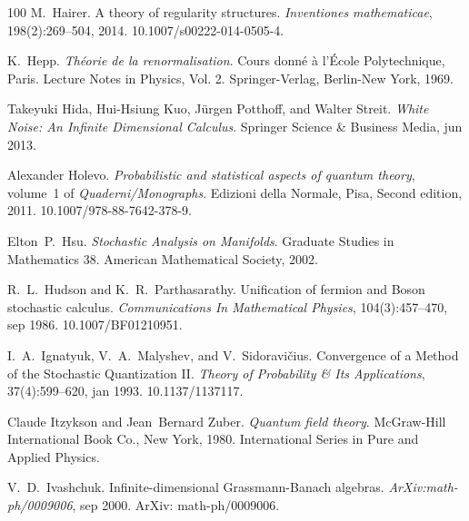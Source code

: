 \documentclass{article}
\newcommand{\tmtextit}[1]{{\itshape{#1}}}
\begin{document}
\begin{thebibliography}{100}
  M.~Hairer. {\newblock}A theory of regularity
  structures. {\newblock}\tmtextit{Inventiones mathematicae}, 198(2):269--504,
  2014.
  {\newblock}\href{Https://doi.org/10.1007/s00222-014-0505-4}{}10.1007/s00222-014-0505-4.{\newblock}
  
  K.~Hepp. {\newblock}\tmtextit{Th{\'e}orie de la
  renormalisation}. {\newblock}Cours donn{\'e} {\`a} l'{\'E}cole
  Polytechnique, Paris. Lecture Notes in Physics, Vol. 2. Springer-Verlag,
  Berlin-New York, 1969.{\newblock}
  
  Takeyuki Hida, Hui-Hsiung Kuo, J{\"u}rgen
  Potthoff, and  Walter Streit. {\newblock}\tmtextit{White Noise: An Infinite
  Dimensional Calculus}. {\newblock}Springer Science \& Business Media, jun
  2013.{\newblock}
  
  Alexander Holevo. {\newblock}\tmtextit{Probabilistic and
  statistical aspects of quantum theory},  volume~1  of
  \tmtextit{Quaderni/Monographs}. {\newblock}Edizioni della Normale, Pisa,
  Second  edition, 2011.
  {\newblock}\href{Https://doi.org/10.1007/978-88-7642-378-9}{}10.1007/978-88-7642-378-9.{\newblock}
  
  Elton~P.~Hsu.
  {\newblock}\tmtextit{Stochastic Analysis on Manifolds}. {\newblock}Graduate
  Studies in Mathematics 38. American Mathematical Society, 2002.{\newblock}
  
  R.~L.~Hudson  and  K.~R.~Parthasarathy.
  {\newblock}Unification of fermion and Boson stochastic calculus.
  {\newblock}\tmtextit{Communications In Mathematical Physics},
  104(3):457--470, sep 1986.
  {\newblock}\href{Https://doi.org/10.1007/BF01210951}{}10.1007/BF01210951.{\newblock}
  
  I.~A.~Ignatyuk, V.~A.~Malyshev, and 
  V.~Sidoravi{\v c}ius. {\newblock}Convergence of a Method of the Stochastic
  Quantization II. {\newblock}\tmtextit{Theory of Probability \& Its
  Applications}, 37(4):599--620, jan 1993.
  {\newblock}\href{Https://doi.org/10.1137/1137117}{}10.1137/1137117.{\newblock}
  
  Claude Itzykson  and  Jean~Bernard Zuber.
  {\newblock}\tmtextit{Quantum field theory}. {\newblock}McGraw-Hill
  International Book Co., New York, 1980. {\newblock}International Series in
  Pure and Applied Physics.{\newblock}
  
  V.~D.~Ivashchuk.
  {\newblock}Infinite-dimensional Grassmann-Banach algebras.
  {\newblock}\tmtextit{ArXiv:math-ph/0009006}, sep 2000. {\newblock}ArXiv:
  math-ph/0009006.{\newblock}
  

\end{thebibliography}
\end{document}
